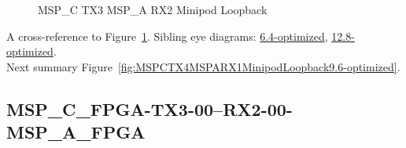 \begin{figure}[h]
\begin{subfigure}{0.33\textwidth}
\hyperref[sec:MSPCFPGATX306RX206MSPAFPGA9.6-optimized]{}
\end{subfigure}\hspace*{\fill}
\begin{subfigure}{0.33\textwidth}
\hyperref[sec:MSPCFPGATX307RX207MSPAFPGA9.6-optimized]{}
\end{subfigure}\hspace*{\fill}
\begin{subfigure}{0.33\textwidth}
\hyperref[sec:MSPCFPGATX308RX208MSPAFPGA9.6-optimized]{}
\end{subfigure}

\begin{subfigure}{0.33\textwidth}
\hyperref[sec:MSPCFPGATX309RX209MSPAFPGA9.6-optimized]{}
\end{subfigure}\hspace*{\fill}
\begin{subfigure}{0.33\textwidth}
\hyperref[sec:MSPCFPGATX310RX210MSPAFPGA9.6-optimized]{}
\end{subfigure}\hspace*{\fill}
\begin{subfigure}{0.33\textwidth}
\hyperref[sec:MSPCFPGATX311RX211MSPAFPGA9.6-optimized]{}
\end{subfigure}

\caption{MSP\_C TX3 MSP\_A RX2 Minipod Loopback} \label{fig:MSPCTX3MSPARX2MinipodLoopback9.6-optimized}
\end{figure}

A cross-reference to Figure~\ref{fig:MSPCTX3MSPARX2MinipodLoopback9.6-optimized}.
Sibling eye diagrams: \hyperref[sec:MSPCTX3MSPARX2MinipodLoopback6.4-optimized]{6.4-optimized}, \hyperref[sec:MSPCTX3MSPARX2MinipodLoopback12.8-optimized]{12.8-optimized}. \\
Next summary Figure~\ref{fig:MSPCTX4MSPARX1MinipodLoopback9.6-optimized}.
\clearpage
% 
\subsection{MSP\_C\_FPGA-TX3-00--RX2-00-MSP\_A\_FPGA}\label{sec:MSPCFPGATX300RX200MSPAFPGA9.6-optimized}

